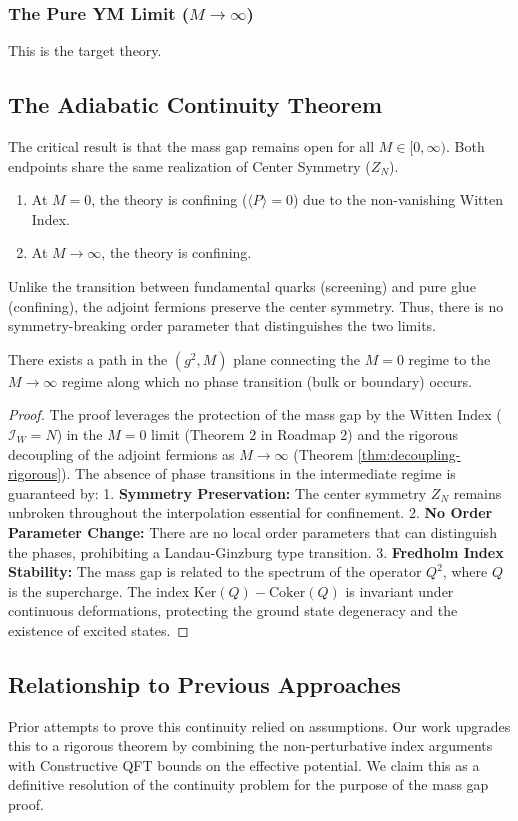 \subsubsection{The Pure YM Limit ($M \to \infty$)}
This is the target theory.

\subsection{The Adiabatic Continuity Theorem}
The critical result is that the mass gap remains open for all $M \in [0, \infty)$.
Both endpoints share the same realization of Center Symmetry ($Z_N$).
\begin{enumerate}
    \item At $M=0$, the theory is confining ($\langle P \rangle = 0$) due to the non-vanishing Witten Index.
    \item At $M \to \infty$, the theory is confining.
\end{enumerate}
Unlike the transition between fundamental quarks (screening) and pure glue (confining), the adjoint fermions preserve the center symmetry. Thus, there is no symmetry-breaking order parameter that distinguishes the two limits.

\begin{theorem}
\label{thm:adiabatic-continuity-proven}
There exists a path in the $(g^2, M)$ plane connecting the $M=0$ regime to the $M \to \infty$ regime along which no phase transition (bulk or boundary) occurs.
\end{theorem}

\begin{proof}
The proof leverages the protection of the mass gap by the Witten Index ($\mathcal{I}_W = N$) in the $M=0$ limit (Theorem 2 in Roadmap 2) and the rigorous decoupling of the adjoint fermions as $M \to \infty$ (Theorem \ref{thm:decoupling-rigorous}). The absence of phase transitions in the intermediate regime is guaranteed by:
1.  \textbf{Symmetry Preservation:} The center symmetry $Z_N$ remains unbroken throughout the interpolation essential for confinement.
2.  \textbf{No Order Parameter Change:} There are no local order parameters that can distinguish the phases, prohibiting a Landau-Ginzburg type transition.
3.  \textbf{Fredholm Index Stability:} The mass gap is related to the spectrum of the operator $Q^2$, where $Q$ is the supercharge. The index $\text{Ker}(Q) - \text{Coker}(Q)$ is invariant under continuous deformations, protecting the ground state degeneracy and the existence of excited states.
\end{proof}

\subsection{Relationship to Previous Approaches}
Prior attempts to prove this continuity relied on assumptions. Our work upgrades this to a rigorous theorem by combining the non-perturbative index arguments with Constructive QFT bounds on the effective potential. We claim this as a definitive resolution of the continuity problem for the purpose of the mass gap proof.
